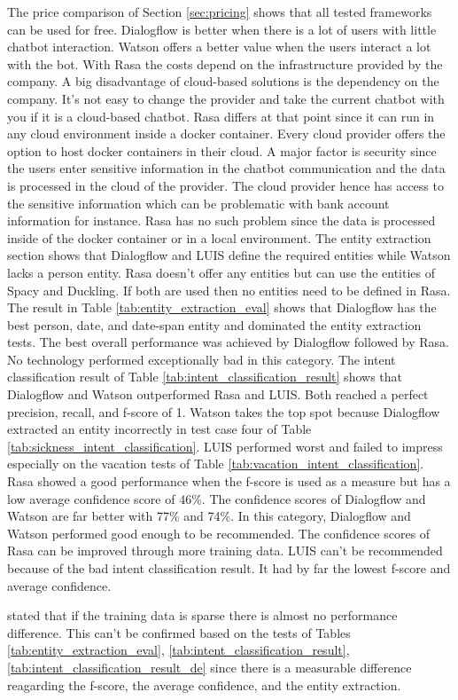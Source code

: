 The price comparison of Section \ref{sec:pricing} shows that all 
tested frameworks can be used for free.
Dialogflow is better when there is a lot of users with little chatbot interaction.
Watson offers a better value when the users interact a lot with the bot.
With Rasa the costs depend on the infrastructure provided by the company.
A big disadvantage of cloud-based solutions is the dependency on the company.
It's not easy to change the provider and take the current chatbot with you if it 
is a cloud-based chatbot. 
Rasa differs at that point since it can run in any cloud environment inside a docker container.
Every cloud provider offers the option to host docker containers in their cloud.
A major factor is security since the users enter sensitive information in the chatbot communication
and the data is processed in the cloud of the provider.
The cloud provider hence has access to the sensitive information which can be problematic with
bank account information for instance.
Rasa has no such problem since the data is processed inside of the docker container or in a 
local environment.
The entity extraction section shows that Dialogflow and LUIS 
define the required entities while Watson lacks a person entity.
Rasa doesn't offer any entities but can use the entities of 
Spacy and Duckling.
If both are used then no entities need to be defined in Rasa.
The result in Table \ref{tab:entity_extraction_eval} shows that 
Dialogflow has the best person, date, and date-span entity and dominated the 
entity extraction tests.
The best overall performance was achieved by Dialogflow followed by Rasa.
No technology performed exceptionally bad in this category.
The intent classification result of Table \ref{tab:intent_classification_result}
shows that Dialogflow and Watson outperformed Rasa and LUIS.
Both reached a perfect precision, recall, and f-score of 1.
Watson takes the top spot because Dialogflow extracted an entity incorrectly 
in test case four of Table \ref{tab:sickness_intent_classification}.
LUIS performed worst and failed to impress especially on the vacation tests
of Table \ref{tab:vacation_intent_classification}.
Rasa showed a good performance when the f-score is used as a measure but 
has a low average confidence score of 46\%.
The confidence scores of Dialogflow and Watson are far better with 77\% and 74\%.
In this category, Dialogflow and Watson performed good enough to be recommended.
The confidence scores of Rasa can be improved through more training data.
LUIS can't be recommended because of the bad intent classification result.
It had by far the lowest f-score and average confidence.

\citet{braunEvaluatingNLU} stated that if the training data is sparse there is almost no performance difference.
This can't be confirmed based on the tests of Tables 
\ref{tab:entity_extraction_eval}, \ref{tab:intent_classification_result}, \ref{tab:intent_classification_result_de}
since there is a measurable difference reagarding the f-score, the average confidence, and the entity extraction.
